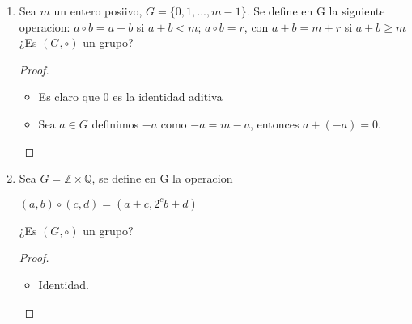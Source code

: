 \documentclass{article}
\theoremstyle{break}
\begin{document}
\begin{enumerate}
			\begin{proof}
				Sea $\ast:\mathbb{Q}(\sqrt{d})\times\mathbb{Q}(\sqrt{d})\rightarrow \mathbb{Q}(\sqrt{d})$ dada por $\ast(x+y\sqrt{d}, u+v\sqrt{d})=x+y\sqrt{d} \ast u+v\sqrt{d}=(xu-yv)+(xv+yu)\sqrt{d}$.
				\begin{itemize}
					\item Sea $e=1+0\sqrt{d}$ entonces sea $x+y\sqrt{d}\in\mathbb{Q}(\sqrt{d})$, $(x+y\sqrt{d})\ast e=(1*x+y\sqrt{d})\ast =e\ast(x+y\sqrt{d})\ast $ entonces $e$ es a identidad multiplicativa en $\mathbb{Q}(\sqrt{d})$. 
					\item Sea $u=(x+y\sqrt{d})$ definimos $u^{-1}=\frac{x-y\sqrt{d}}{x^2+y^2}$, entonces
					$u\ast u^{-1}=(x+y\sqrt{d})\ast\frac{x-y\sqrt{d}}{x^2+y^2} =(x\ast\frac{x}{x^2+y^2}-y\ast\frac{-y}{x^2+y^2})+ (x\ast\frac{y}{x^2+y^2}+y\ast\frac{x}{x^2+y^2})=(\frac{x^2+y^2}{x^2+y^2}+\frac{xy-yx}{x^2+y^2})=1=(\frac{x}{x^2+y^2}\ast x-\frac{-y}{x^2+y^2}\ast y)+ (\frac{y}{x^2+y^2}\ast x+\frac{x}{x^2+y^2}\ast y)=u^{-1}\ast u$ 
					\item La asociatividad de $\ast$se sigue de la asocitividad en $\mathbb{Q}$
				\end{itemize}
			\end{proof}
			
		\item Sea $m$ un entero posiivo, $G=\{0,1,...,m-1\}$. Se define en G la siguiente operacion: $a\circ b=a+b$ si $a+b<m$; $a\circ b=r$, con $a+b=m+r$ si $a+b \geq m$ ¿Es $(G,\circ)$ un grupo?
		
		\begin{proof}
			
			\begin{itemize}
				\item Es claro que 0 es la identidad aditiva
				\item Sea $a\in G$ definimos $-a$ como $-a=m-a$, entonces $a+(-a)=0$.
			\end{itemize}
		\end{proof}
		\item Sea $G=\mathbb{Z}\times\mathbb{Q}$, se define en G la operacion
		
		\begin{center}
		$(a,b)\circ(c,d)=(a+c, 2^c b+d)$
		\end{center}
		¿Es $(G,\circ )$ un grupo?
		
		\begin{proof}
			
			\begin{itemize}
				\item Identidad.
				

\end{itemize}
\end{proof}
\end{enumerate}
\end{document}
